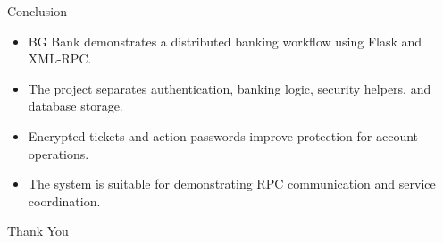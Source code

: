 \documentclass[aspectratio=169]{beamer}
\begin{document}
\begin{frame}{Conclusion}
    \begin{itemize}
        \item BG Bank demonstrates a distributed banking workflow using Flask and XML-RPC.
        \item The project separates authentication, banking logic, security helpers, and database storage.
        \item Encrypted tickets and action passwords improve protection for account operations.
        \item The system is suitable for demonstrating RPC communication and service coordination.
    \end{itemize}
\end{frame}

\begin{frame}
    \centering
    \Huge Thank You
\end{frame}
\end{document}
